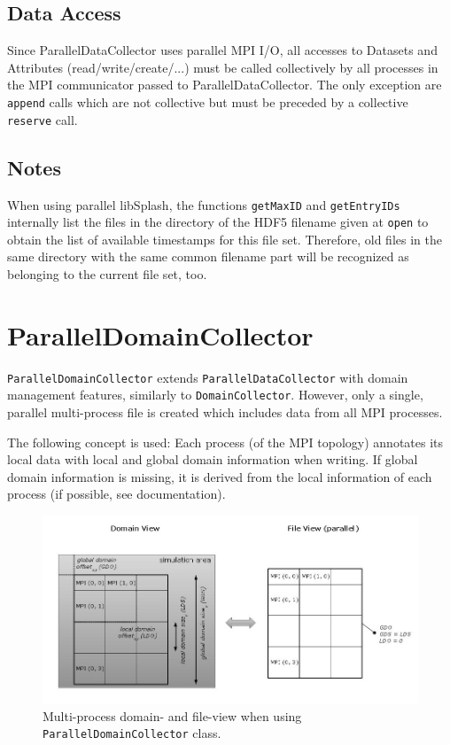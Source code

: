 \documentclass[a4paper,10pt,BCOR12mm]{report}
\newcommand{\code}[1]{\small \texttt{#1}}
\begin{document}
\section{Data Access}

Since ParallelDataCollector uses parallel MPI I/O, all accesses to Datasets and Attributes (read/write/create/...)
must be called collectively by all processes in the MPI communicator passed to ParallelDataCollector.
The only exception are \code{append} calls which are not collective but must be preceded by a collective \code{reserve} call.


\section{Notes}

When using parallel libSplash, the functions \code{getMaxID} and \code{getEntryIDs}
internally list the files in the directory of the HDF5 filename given at \code{open}
to obtain the list of available timestamps for this file set.
Therefore, old files in the same directory with the same common filename part will be recognized as belonging
to the current file set, too.



\chapter{ParallelDomainCollector}

\code{ParallelDomainCollector} extends \code{ParallelDataCollector} with domain management features,
similarly to \code{DomainCollector}.
However, only a single, parallel multi-process file is created which includes data from all MPI processes.

The following concept is used: Each process (of the MPI topology)
annotates its local data with local and global domain information when writing.
If global domain information is missing, it is derived from the local information of each process
(if possible, see documentation).

\begin{figure}[h]
 \includegraphics[width=\linewidth]{../img/domains_parallel.jpg}
 \caption{Multi-process domain- and file-view when using \code{ParallelDomainCollector} class.}
\end{figure}
\end{document}
